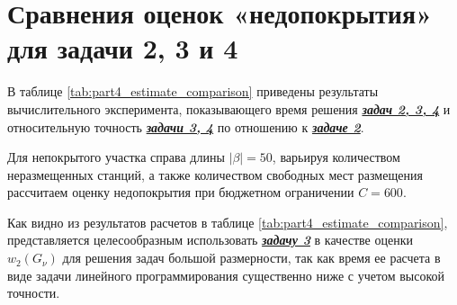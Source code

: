 

\section{Сравнения оценок «недопокрытия» для задачи 2, 3 и 4}\label{part4:task_234}

В таблице \cref{tab:part4_estimate_comparison} приведены результаты вычислительного эксперимента, показывающего время решения \underline{\textit{\textbf{задач 2, 3, 4}}} и относительную точность \underline{\textit{\textbf{задачи 3, 4}}} по отношению к \underline{\textit{\textbf{задаче 2}}}.

Для непокрытого участка справа длины $|\beta| = 50$, варьируя количеством неразмещенных станций, а также количеством свободных мест размещения рассчитаем оценку недопокрытия при бюджетном ограничении $C=600$.


Как видно из результатов расчетов в таблице \cref{tab:part4_estimate_comparison}, представляется целесообразным  использовать  \underline{\textit{\textbf{задачу 3}}} в качестве оценки $w_2 (G_\nu )$ для решения задач большой размерности, так как время ее расчета в виде задачи линейного программирования существенно ниже с учетом высокой точности.


